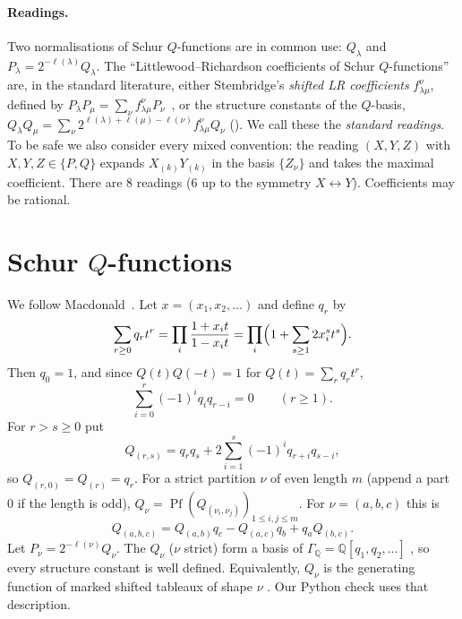 \documentclass[11pt]{article}
\theoremstyle{definition}
\theoremstyle{remark}
\begin{document}
\paragraph{Readings.}
Two normalisations of Schur $Q$-functions are in common use: $Q_\lambda$ and
$P_\lambda=2^{-\ell(\lambda)}Q_\lambda$. The ``Littlewood--Richardson coefficients of
Schur $Q$-functions'' are, in the standard literature, either Stembridge's
\emph{shifted LR coefficients} $f^\nu_{\lambda\mu}$, defined by
$P_\lambda P_\mu=\sum_\nu f^\nu_{\lambda\mu}P_\nu$~\cite{Ste}, or the structure constants of
the $Q$-basis, $Q_\lambda Q_\mu=\sum_\nu 2^{\ell(\lambda)+\ell(\mu)-\ell(\nu)}f^\nu_{\lambda\mu}Q_\nu$
(\cite[III.8]{Mac}). We call these the \emph{standard readings}. To be safe we also
consider every mixed convention: the reading $(X,Y,Z)$ with $X,Y,Z\in\{P,Q\}$ expands
$X_{(k)}Y_{(k)}$ in the basis $\{Z_\nu\}$ and takes the maximal coefficient. There are
$8$ readings (6 up to the symmetry $X\leftrightarrow Y$). Coefficients may be rational.

\section{\texorpdfstring{Schur $Q$-functions}{Schur Q-functions}}

We follow Macdonald~\cite[III.8]{Mac}. Let $x=(x_1,x_2,\dots)$ and define $q_r$ by
\[
\sum_{r\ge0} q_r t^r = \prod_i \frac{1+x_it}{1-x_it}
 = \prod_i\Bigl(1+\sum_{s\ge1}2x_i^st^s\Bigr).
\]
Then $q_0=1$, and since $Q(t)Q(-t)=1$ for $Q(t)=\sum_r q_rt^r$,
\begin{equation}\label{eq:rel}
\sum_{i=0}^{r}(-1)^iq_iq_{r-i}=0\qquad(r\ge1).
\end{equation}
For $r>s\ge0$ put
\begin{equation}\label{eq:Q2}
Q_{(r,s)} = q_rq_s + 2\sum_{i=1}^{s}(-1)^iq_{r+i}q_{s-i},
\end{equation}
so $Q_{(r,0)}=Q_{(r)}=q_r$. For a strict partition $\nu$ of even length $m$ (append a
part $0$ if the length is odd), $Q_\nu=\operatorname{Pf}(Q_{(\nu_i,\nu_j)})_{1\le i,j\le m}$.
For $\nu=(a,b,c)$ this is
\begin{equation}\label{eq:pf}
Q_{(a,b,c)} = Q_{(a,b)}q_c - Q_{(a,c)}q_b + q_aQ_{(b,c)} .
\end{equation}
Let $P_\nu=2^{-\ell(\nu)}Q_\nu$. The $Q_\nu$ ($\nu$ strict) form a basis of
$\Gamma_{\mathbb Q}=\mathbb Q[q_1,q_2,\dots]$ \cite[III (8.9)]{Mac}, so every
structure constant is well defined. Equivalently, $Q_\nu$ is the generating function of
marked shifted tableaux of shape $\nu$ \cite[III (8.16)]{Mac}. Our Python check uses that
description.
\end{document}
